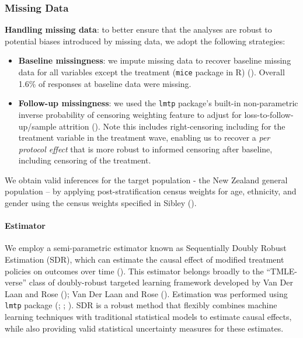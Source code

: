 \documentclass[
  singlecolumn]{article}
\let\oldparagraph\paragraph
\renewcommand{\paragraph}[1]{\oldparagraph{#1}\mbox{}}
\begin{document}
\subsubsection{Missing Data}\label{missing-data}

\textbf{Handling missing data}: to better ensure that the analyses are
robust to potential biases introduced by missing data, we adopt the
following strategies:

\begin{itemize}
\item
  \textbf{Baseline missingness}: we impute missing data to recover
  baseline missing data for all variables except the treatment
  (\texttt{mice} package in R) (). Overall 1.6\% of responses at baseline data were missing.
\item
  \textbf{Follow-up missingness}: we used the \texttt{lmtp} package's
  built-in non-parametric inverse probability of censoring weighting
  feature to adjust for loss-to-follow-up/sample attrition
  (). Note this
  includes right-censoring including for the treatment variable in the
  treatment wave, enabling us to recover a \emph{per protocol effect}
  that is more robust to informed censoring after baseline, including
  censoring of the treatment.
\end{itemize}

We obtain valid inferences for the target population - the New Zealand
general population -- by applying post-stratification census weights for
age, ethnicity, and gender using the census weights specified in Sibley
().

\paragraph{Estimator}\label{estimator}

We employ a semi-parametric estimator known as Sequentially Doubly
Robust Estimation (SDR), which can estimate the causal effect of
modified treatment policies on outcomes over time
(). This estimator
belongs broadly to the ``TMLE-verse'' class of doubly-robust targeted
learning framework developed by Van Der Laan and Rose
(); Van Der Laan and Rose
(). Estimation was performed using
\texttt{lmtp} package (; ;
). SDR is a robust
method that flexibly combines machine learning techniques with
traditional statistical models to estimate causal effects, while also
providing valid statistical uncertainty measures for these estimates.
\end{document}
